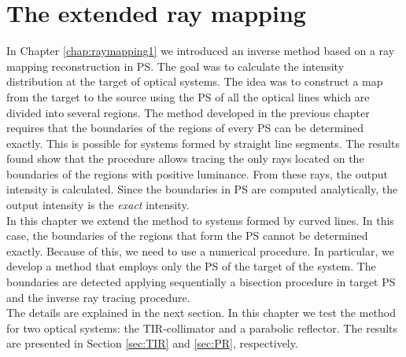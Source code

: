 \chapter{The extended ray mapping}
\label{chap:raymapping2}
In Chapter \ref{chap:raymapping1} we introduced an inverse method based on a ray mapping reconstruction in PS.
The goal was to calculate the intensity distribution at the target of optical systems. 
The idea was to construct a map from the target  to the source  using the PS of all the optical lines which are divided into several regions.  
The method developed in the previous chapter requires that the boundaries of the regions of every PS can be determined exactly. This is possible for systems formed by straight line segments.
The results found show that the procedure allows tracing the only rays located
 on the boundaries of the regions with positive luminance. From these rays, the output intensity is calculated. Since the boundaries in PS are computed analytically, the output intensity is the \textit{exact} intensity. \\ \indent
In this chapter we extend the method to systems formed by curved lines. In this case, the boundaries of the regions that form the PS cannot be determined exactly.
Because of this, we need to use a numerical procedure. In particular, we develop a method that employs only the PS of the target of the system. 
The boundaries are detected applying sequentially a bisection procedure in target PS and the inverse ray tracing procedure.\\ \indent
The details are explained in the next section. In this chapter we test the method for two optical systems: the TIR-collimator and a parabolic reflector. The results are presented in Section \ref{sec:TIR} and \ref{sec:PR}, respectively.
